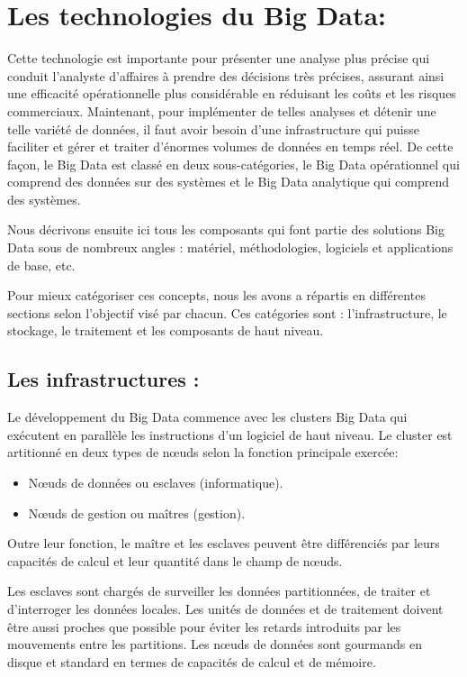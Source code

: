 \section{Les technologies du Big Data:}
Cette technologie est importante pour présenter une analyse plus précise qui conduit l’analyste d’affaires à prendre des décisions très précises, assurant ainsi une efficacité opérationnelle plus considérable en réduisant les coûts et les risques commerciaux. Maintenant, pour implémenter de telles analyses et détenir une telle variété de données, il faut avoir besoin d’une infrastructure qui puisse faciliter et gérer et traiter d’énormes volumes de données en temps réel. De cette façon, le Big Data est classé en deux sous-catégories, le Big Data opérationnel qui comprend des données sur des systèmes et le Big Data analytique qui comprend des systèmes. 

Nous décrivons ensuite ici tous les composants qui font partie des solutions Big Data sous de nombreux angles : matériel, méthodologies, logiciels et applications de base, etc.

Pour mieux catégoriser ces concepts, nous les avons a répartis en différentes sections selon l'objectif visé par chacun. Ces catégories sont : l'infrastructure, le stockage, le traitement et les composants de haut niveau.

\subsection{Les infrastructures :}
Le développement du Big Data commence avec les clusters Big Data qui exécutent en parallèle les instructions d'un logiciel de haut niveau. Le cluster est artitionné en deux types de nœuds selon la fonction principale exercée:

\begin{itemize}[label=\textbullet]
	\item Nœuds de données ou esclaves (informatique).
	\item Nœuds de gestion ou maîtres (gestion).
\end{itemize}

Outre leur fonction, le maître et les esclaves peuvent être différenciés par leurs capacités de calcul et leur quantité dans le champ de nœuds.

Les esclaves sont chargés de surveiller les données partitionnées, de traiter et d'interroger les données locales. Les unités de données et de traitement doivent être aussi proches que possible pour éviter les retards introduits par les mouvements entre les partitions. Les nœuds de données sont gourmands en disque et standard en termes de capacités de calcul et de mémoire.


